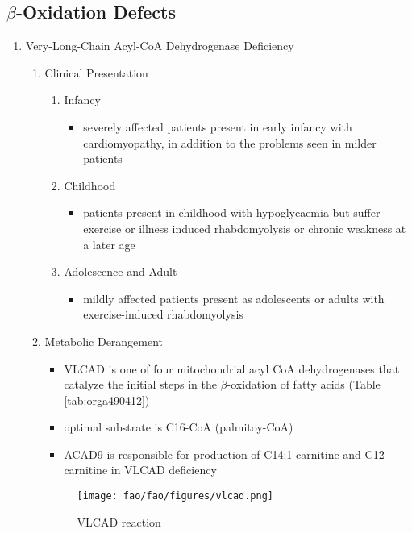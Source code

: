 \documentclass{scrartcl}
\begin{document}
\subsection{\(\beta\)-Oxidation Defects}
\label{sec:org30b1cfc}
\begin{enumerate}
\item Very-Long-Chain Acyl-CoA Dehydrogenase Deficiency
\label{sec:org731f26b}
\begin{enumerate}
\item Clinical Presentation
\label{sec:org44e06f4}
\begin{enumerate}
\item Infancy
\label{sec:orgd4b8f26}
\begin{itemize}
\item severely affected patients present in early infancy with
cardiomyopathy, in addition to the problems seen in milder patients
\end{itemize}
\item Childhood
\label{sec:org394bc65}
\begin{itemize}
\item patients present in childhood with hypoglycaemia but suffer exercise
or illness induced rhabdomyolysis or chronic weakness at a later age
\end{itemize}
\item Adolescence and Adult
\label{sec:org331b754}
\begin{itemize}
\item mildly affected patients present as adolescents or adults with
exercise-induced rhabdomyolysis
\end{itemize}
\end{enumerate}
\item Metabolic Derangement
\label{sec:orge2b2941}
\begin{itemize}
\item VLCAD is one of four mitochondrial acyl CoA dehydrogenases that
catalyze the initial steps in the \(\beta\)-oxidation of fatty acids
(Table \ref{tab:orga490412})
\item optimal substrate is C16-CoA (palmitoy-CoA)
\item ACAD9 is responsible for production of C14:1-carnitine and
C12-carnitine in VLCAD deficiency
\end{itemize}
\begin{figure}[htbp]
\centering
\texttt{[image: fao/fao/figures/vlcad.png]}
\caption{\label{fig:org776fbf0}VLCAD reaction}
\end{figure}


\end{enumerate}
\end{enumerate}
\end{document}
